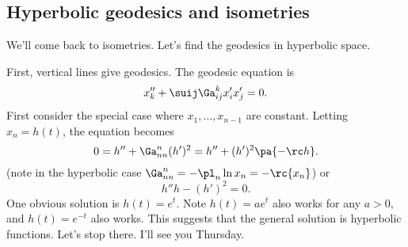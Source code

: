 \subsection{Hyperbolic geodesics and isometries}
We'll come back to isometries. %
Let's find the geodesics in hyperbolic space.

First, vertical lines give geodesics. The geodesic equation is 
\[
x_k''+\suij \Ga_{ij}^k x_i'x_j' =0.
\]
First consider the special case where $x_1,\ldots,x_{n-1}$ are constant. 
Letting $x_n=h(t)$, the equation becomes
\[
0=h''+\Ga_{nn}^n (h')^2=h''+(h')^2\pa{-\rc h}.
\]%
(note in the hyperbolic case $\Ga_{nn}^n=-\pl_n \ln x_n =-\rc{x_n}$) or
\[
h''h-(h')^2=0.
\]
One obvious solution is $h(t)=e^t$. Note $h(t)=ae^t$ also works for any $a>0$, and %
$h(t)=e^{-t}$ also works. This suggests that the general solution is hyperbolic functions. Let's stop there. I'll see you Thursday.